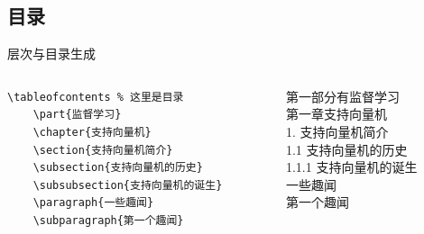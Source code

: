 \subsection{目录}
\begin{frame}[fragile]{层次与目录生成}
    \begin{columns}
        \begin{column}{.6\textwidth}
            \lstset{language=[LaTeX]TeX}
            \begin{lstlisting}[basicstyle=\ttfamily\small]
    \tableofcontents % 这里是目录
    \part{监督学习}
    \chapter{支持向量机}
    \section{支持向量机简介}
    \subsection{支持向量机的历史}
    \subsubsection{支持向量机的诞生}
    \paragraph{一些趣闻}
    \subparagraph{第一个趣闻}\end{lstlisting}
        \end{column}
        \begin{column}{.4\textwidth}
            第一部分\quad 有监督学习\\
            第一章\quad 支持向量机 \\
            1. 支持向量机简介 \\
            1.1 支持向量机的历史 \\
            1.1.1 支持向量机的诞生 \\
            一些趣闻  \\
            第一个趣闻
        \end{column}
    \end{columns}

\end{frame}

